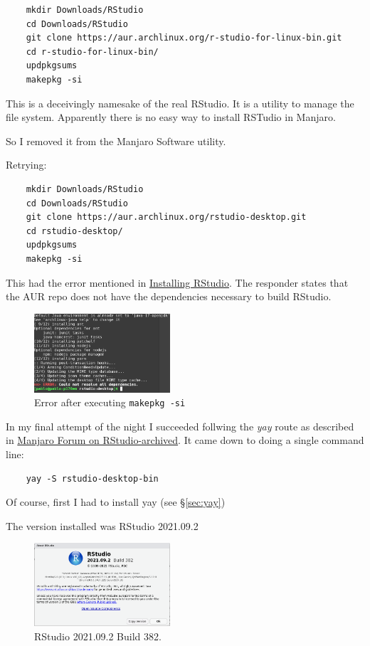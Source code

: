 \documentclass[]{scrartcl}
\begin{document}
\begin{verbatim}
	mkdir Downloads/RStudio
	cd Downloads/RStudio
	git clone https://aur.archlinux.org/r-studio-for-linux-bin.git
	cd r-studio-for-linux-bin/
	updpkgsums
	makepkg -si	
\end{verbatim}

This is a deceivingly namesake of the real RStudio. It is a utility to manage the file system.
Apparently there is no easy way to install RSTudio in Manjaro.

So I removed it from the Manjaro Software utility.

Retrying:

\begin{verbatim}
	mkdir Downloads/RStudio
	cd Downloads/RStudio
	git clone https://aur.archlinux.org/rstudio-desktop.git
	cd rstudio-desktop/
	updpkgsums
	makepkg -si	
\end{verbatim}

This had the error mentioned in \href{https://forum.manjaro.org/t/rstudio-on-pinebook-pro-aarch64/60827/6?u=padames}{Installing RStudio}. The responder states that the AUR repo does not have the dependencies necessary to build RStudio.

\begin{figure}[!htb]
	\centering
	\caption{Error after executing \texttt{makepkg -si}}
	\includegraphics[width=0.45\textwidth]{Images/ErrorInstallingAUR.png}
\end{figure}

In my final attempt of the night I succeeded follwing the \textit{yay} route as described in \href{https://archived.forum.manjaro.org/t/using-the-statistical-package-r-in-manjaro-with-rstudio/484}{Manjaro Forum on RStudio-archived}. 
It came down to doing a single command line:
\begin{verbatim}
	yay -S rstudio-desktop-bin
\end{verbatim}
Of course, first I had to install yay (see \S\ref{sec:yay})

The version installed was RStudio 2021.09.2

\begin{figure}[!htb]
	\centering
	\caption{RStudio 2021.09.2 Build 382.}
	\includegraphics[width=0.45\textwidth]{Images/RStudioSplashWindowFeb07-2022.png}
\end{figure}
\end{document}
